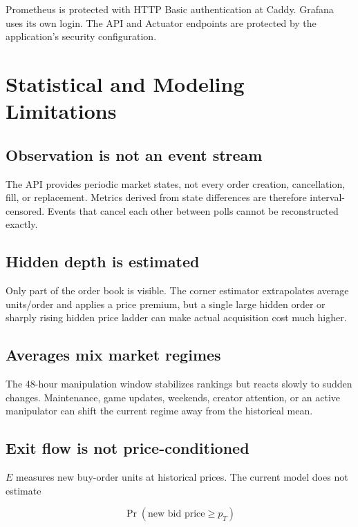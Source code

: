 \documentclass[11pt,a4paper]{article}
\begin{document}
Prometheus is protected with HTTP Basic authentication at Caddy. Grafana uses its own login.
The API and Actuator endpoints are protected by the application's security configuration.

\section{Statistical and Modeling Limitations}

\subsection{Observation is not an event stream}

The API provides periodic market states, not every order creation, cancellation, fill, or
replacement. Metrics derived from state differences are therefore interval-censored. Events
that cancel each other between polls cannot be reconstructed exactly.

\subsection{Hidden depth is estimated}

Only part of the order book is visible. The corner estimator extrapolates average units/order
and applies a price premium, but a single large hidden order or sharply rising hidden price
ladder can make actual acquisition cost much higher.

\subsection{Averages mix market regimes}

The 48-hour manipulation window stabilizes rankings but reacts slowly to sudden changes.
Maintenance, game updates, weekends, creator attention, or an active manipulator can shift the
current regime away from the historical mean.

\subsection{Exit flow is not price-conditioned}

$E$ measures new buy-order units at historical prices. The current model does not estimate

\begin{equation}
\Pr(\text{new bid price}\ge p_T)
\end{equation}
\end{document}
